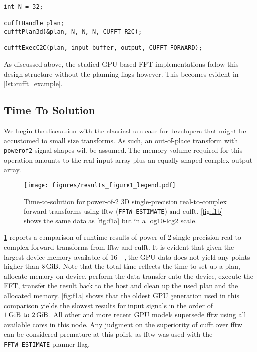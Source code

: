 \begin{lstlisting}[caption={Minimal usage example of the cuFFT single precision real-to-complex planner API. Memory management is omitted.},label={lst:cufft_example}]
int N = 32;

cufftHandle plan;
cufftPlan3d(&plan, N, N, N, CUFFT_R2C);

cufftExecC2C(plan, input_buffer, output, CUFFT_FORWARD);
\end{lstlisting}

As discussed above, the studied GPU based FFT implementations follow this design structure without the planning flags however. This becomes evident in \cref{lst:cufft_example}. 

\subsection{Time To Solution}
\label{ssec:tts}

We begin the discussion with the classical use case for developers that might be accustomed to small size transforms. As such, an out-of-place transform with \texttt{powerof2} signal shapes will be assumed. The memory volume required for this operation amounts to the real input array plus an equally shaped complex output array.   

\begin{figure}[!tbp]
  \centering
  \texttt{[image: figures/results\_figure1\_legend.pdf]}
  \hfill
  \caption{Time-to-solution for power-of-2 3D single-precision real-to-complex forward transforms using fftw (\texttt{FFTW\_ESTIMATE}) and cufft. \cref{fig:f1b} shows the same data as \cref{fig:f1a} but in a log10-log2 scale.}
  \label{fig:tts}
\end{figure}

\cref{fig:tts} reports a comparison of runtime results of power-of-2 single-precision real-to-complex forward transforms from fftw and cufft. It is evident that given the largest device memory available of  \SI{16}{\gibi\byte}, the GPU data does not yield any points higher than $\SI{8}{\gibi\byte}$. Note that the total time reflects the time to set up a plan, allocate memory on device, perform the data transfer onto the device, execute the FFT, transfer the result back to the host and clean up the used plan and the allocated memory. \cref{fig:f1a} shows that the oldest GPU generation used in this comparison yields the slowest results for input signals in the order of $\SIrange{1}{2}{\gibi\byte}$. All other and more recent GPU models supersede fftw using all available cores in this node. Any judgment on the superiority of cufft over fftw can be considered premature at this point, as fftw was used with the \texttt{FFTW\_ESTIMATE} planner flag.

